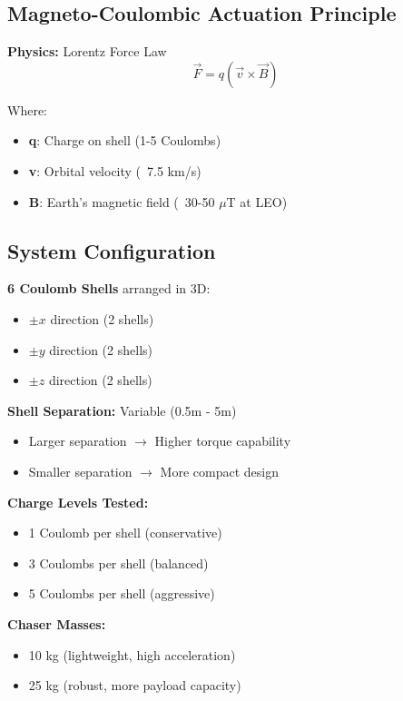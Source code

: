 \documentclass[11pt,a4paper]{article}
\begin{document}
\subsection{Magneto-Coulombic Actuation Principle}

\textbf{Physics:} Lorentz Force Law
\begin{equation}
\vec{F} = q(\vec{v} \times \vec{B})
\end{equation}

Where:
\begin{itemize}[leftmargin=*]
    \item \textbf{q}: Charge on shell (1-5 Coulombs)
    \item \textbf{v}: Orbital velocity (~7.5 km/s)
    \item \textbf{B}: Earth's magnetic field (~30-50 $\mu$T at LEO)
\end{itemize}

\subsection{System Configuration}

\textbf{6 Coulomb Shells} arranged in 3D:
\begin{itemize}[leftmargin=*]
    \item $\pm x$ direction (2 shells)
    \item $\pm y$ direction (2 shells)
    \item $\pm z$ direction (2 shells)
\end{itemize}

\textbf{Shell Separation:} Variable (0.5m - 5m)
\begin{itemize}[leftmargin=*]
    \item Larger separation $\rightarrow$ Higher torque capability
    \item Smaller separation $\rightarrow$ More compact design
\end{itemize}

\textbf{Charge Levels Tested:}
\begin{itemize}[leftmargin=*]
    \item 1 Coulomb per shell (conservative)
    \item 3 Coulombs per shell (balanced)
    \item 5 Coulombs per shell (aggressive)
\end{itemize}

\textbf{Chaser Masses:}
\begin{itemize}[leftmargin=*]
    \item 10 kg (lightweight, high acceleration)
    \item 25 kg (robust, more payload capacity)
\end{itemize}
\end{document}
